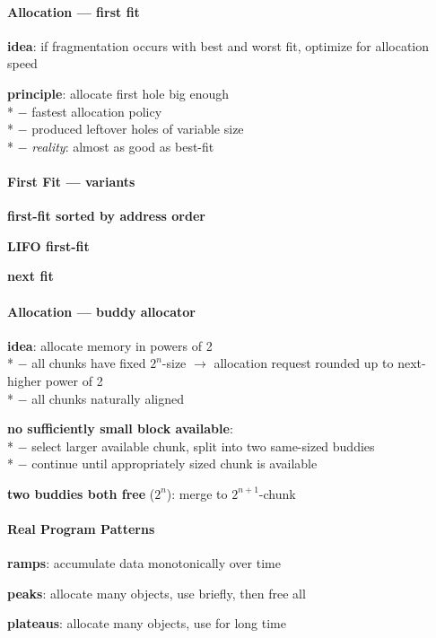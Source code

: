 \paragraph{Allocation --- first fit}
\begin{items}
  \item \textbf{idea}: if fragmentation occurs with best and worst fit, optimize for allocation speed
  \item \textbf{principle}: allocate first hole big enough \\*
    $ - $ fastest allocation policy \\*
    $ - $ produced leftover holes of variable size \\*
    $ - $ \emph{reality}: almost as good as best-fit
\end{items}

\paragraph{First Fit --- variants}
\begin{items}
  \item \textbf{first-fit sorted by address order}
  \item \textbf{LIFO first-fit}
  \item \textbf{next fit}
\end{items}

\paragraph{Allocation --- buddy allocator}
\begin{items}
  \item \textbf{idea}: allocate memory in powers of 2 \\*
    $ - $ all chunks have fixed $ 2^n $-size $ \to $ allocation request rounded up to next-higher power of 2 \\*
    $ - $ all chunks naturally aligned
  \item \textbf{no sufficiently small block available}: \\*
    $ - $ select larger available chunk, split into two same-sized buddies \\*
    $ - $ continue until appropriately sized chunk is available
  \item \textbf{two buddies both free} ($ 2^n $): merge to $ 2^{n+1} $-chunk
\end{items}

\paragraph{Real Program Patterns}
\begin{items}
  \item \textbf{ramps}: accumulate data monotonically over time
  \item \textbf{peaks}: allocate many objects, use briefly, then free all
  \item \textbf{plateaus}: allocate many objects, use for long time
\end{items}

